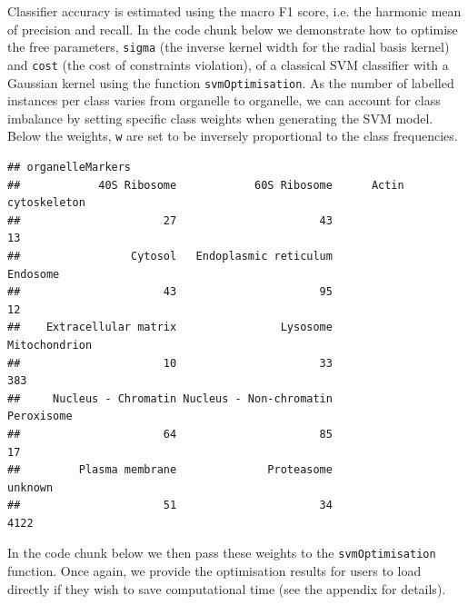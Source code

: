 Classifier accuracy is estimated using the macro F1 score, i.e. the
harmonic mean of precision and recall. In the code chunk below we
demonstrate how to optimise the free parameters, \texttt{sigma} (the
inverse kernel width for the radial basis kernel) and \texttt{cost}
(the cost of constraints violation), of a classical SVM classifier
with a Gaussian kernel using the function \texttt{svmOptimisation}. As
the number of labelled instances per class varies from organelle to
organelle, we can account for class imbalance by setting specific
class weights when generating the SVM model. Below the weights,
\texttt{w} are set to be inversely proportional to the class
frequencies.

\begin{knitrout}
\color{fgcolor}\begin{kframe}
\begin{alltt}
 \hlkwb{<-} \hlstd{(}  \hlstd{=} \hlstd{))}
\end{alltt}
\begin{verbatim}
## organelleMarkers
##            40S Ribosome            60S Ribosome      Actin cytoskeleton 
##                      27                      43                      13 
##                 Cytosol   Endoplasmic reticulum                Endosome 
##                      43                      95                      12 
##    Extracellular matrix                Lysosome           Mitochondrion 
##                      10                      33                     383 
##     Nucleus - Chromatin Nucleus - Non-chromatin              Peroxisome 
##                      64                      85                      17 
##         Plasma membrane              Proteasome                 unknown 
##                      51                      34                    4122
\end{verbatim}
\begin{alltt}
 \hlkwb{<-} \hlopt{/}\hlstd{w[} \hlopt{!=} \hlstd{]}
\end{alltt}
\end{kframe}
\end{knitrout}

In the code chunk below we then pass these weights to the
\texttt{svmOptimisation} function. Once again, we provide the
optimisation results for users to load directly if they wish to save
computational time (see the appendix for details).




